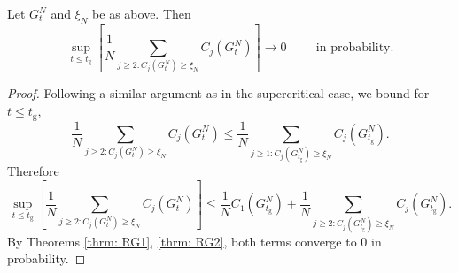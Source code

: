 \begin{lemma}\label{lemma: large clusters below criticality} Let $G^N_t$ and $\xi_N$ be as above. Then \begin{equation}
    \sup_{t\le t_\mathrm{g}} \left[\frac{1}{N}\sum_{j\geq 2: C_j(G^N_t)\ge \xi_N} C_j(G^N_t)\right]\rightarrow 0\hspace{1cm}\text{in probability}.
\end{equation} \end{lemma}\begin{proof} Following a similar argument as in the supercritical case, we bound for $t\leq t_\mathrm{g}$, \begin{equation}
    \frac{1}{N}\sum_{j\geq 2: C_j(G^N_t)\geq \xi_N} C_j(G^N_t) \leq \frac{1}{N}\sum_{j\geq 1: C_j(G^N_{t_\mathrm{g}})\geq \xi_N} C_j(G^N_{t_\mathrm{g}}).
\end{equation} Therefore \begin{equation}
    \sup_{t\le t_\mathrm{g}} \left[\frac{1}{N}\sum_{j\geq 2: C_j(G^N_t)\geq \xi_N} C_j(G^N_t)\right] \leq  \frac{1}{N}C_1(G^N_{t_\mathrm{g}})+ \frac{1}{N}\sum_{j\geq 2: C_j(G^N_{t_\mathrm{g}})\geq \xi_N} C_j(G^N_{t_\mathrm{g}}).
\end{equation} By Theorems \ref{thrm: RG1}, \ref{thrm: RG2}, both terms converge to $0$ in probability. \end{proof}  
